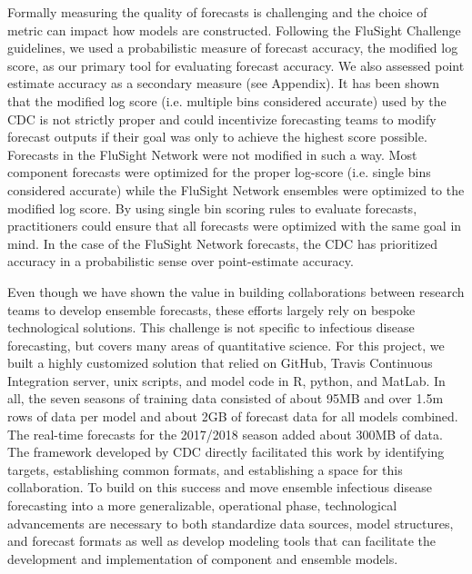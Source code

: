 \documentclass{article}\usepackage[]{graphicx}\usepackage[]{color}
\begin{document}
Formally measuring the quality of forecasts is challenging and the choice of metric can impact how models are constructed.
Following the FluSight Challenge guidelines, we used a probabilistic measure of forecast accuracy, the modified log score, as our primary tool for evaluating forecast accuracy.
We also assessed point estimate accuracy as a secondary measure (see Appendix). 
It has been shown that the modified log score (i.e. multiple bins considered accurate) used by the CDC is not strictly proper and could incentivize forecasting teams to modify forecast outputs if their goal was only to achieve the highest score possible.\cite{Gneiting2007,bracher2019score}
Forecasts in the FluSight Network were not modified in such a way.\cite{reich2019reply} 
Most component forecasts were optimized for the proper log-score (i.e. single bins considered accurate) while the FluSight Network ensembles were optimized to the modified log score. 
By using single bin scoring rules to evaluate forecasts, practitioners could ensure that all forecasts were optimized with the same goal in mind. 
In the case of the FluSight Network forecasts, the CDC has prioritized accuracy in a probabilistic sense over point-estimate accuracy.

Even though we have shown the value in building collaborations between research teams to develop ensemble forecasts, these efforts largely rely on bespoke technological solutions.
This challenge is not specific to infectious disease forecasting, but covers many areas of quantitative science.
For this project, we built a highly customized solution that relied on GitHub, Travis Continuous Integration server, unix scripts, and model code in R, python, and MatLab. 
In all, the seven seasons of training data consisted of about 95MB and over 1.5m rows of data per model and about 2GB of forecast data for all models combined.
The real-time forecasts for the 2017/2018 season added about 300MB of data.
The framework developed by CDC directly facilitated this work by identifying targets, establishing common formats, and establishing a space for this collaboration. To build on this success
and move ensemble infectious disease forecasting into a more generalizable, operational phase, technological advancements are necessary to both standardize data sources, model structures, and forecast formats as well as develop modeling tools that can facilitate the development and implementation of component and ensemble models.
\end{document}

